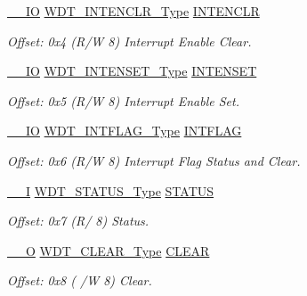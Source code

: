 \begin{DoxyCompactItemize}
\mbox{\hyperlink{core__cm0plus_8h_aec43007d9998a0a0e01faede4133d6be}{\+\_\+\+\_\+\+IO}} \mbox{\hyperlink{union_w_d_t___i_n_t_e_n_c_l_r___type}{W\+D\+T\+\_\+\+I\+N\+T\+E\+N\+C\+L\+R\+\_\+\+Type}} \mbox{\hyperlink{struct_wdt_a20a8733afbfa125c5b04dad935b603b5}{I\+N\+T\+E\+N\+C\+LR}}
\begin{DoxyCompactList}\small\item\em Offset\+: 0x4 (R/W 8) Interrupt Enable Clear. \end{DoxyCompactList}\item 
\mbox{\hyperlink{core__cm0plus_8h_aec43007d9998a0a0e01faede4133d6be}{\+\_\+\+\_\+\+IO}} \mbox{\hyperlink{union_w_d_t___i_n_t_e_n_s_e_t___type}{W\+D\+T\+\_\+\+I\+N\+T\+E\+N\+S\+E\+T\+\_\+\+Type}} \mbox{\hyperlink{struct_wdt_aabffd6be6854e3018e819d5848f109f2}{I\+N\+T\+E\+N\+S\+ET}}
\begin{DoxyCompactList}\small\item\em Offset\+: 0x5 (R/W 8) Interrupt Enable Set. \end{DoxyCompactList}\item 
\mbox{\hyperlink{core__cm0plus_8h_aec43007d9998a0a0e01faede4133d6be}{\+\_\+\+\_\+\+IO}} \mbox{\hyperlink{union_w_d_t___i_n_t_f_l_a_g___type}{W\+D\+T\+\_\+\+I\+N\+T\+F\+L\+A\+G\+\_\+\+Type}} \mbox{\hyperlink{struct_wdt_a535f9dc206f52a85eff66121e803c6db}{I\+N\+T\+F\+L\+AG}}
\begin{DoxyCompactList}\small\item\em Offset\+: 0x6 (R/W 8) Interrupt Flag Status and Clear. \end{DoxyCompactList}\item 
\mbox{\hyperlink{core__cm0plus_8h_af63697ed9952cc71e1225efe205f6cd3}{\+\_\+\+\_\+I}} \mbox{\hyperlink{union_w_d_t___s_t_a_t_u_s___type}{W\+D\+T\+\_\+\+S\+T\+A\+T\+U\+S\+\_\+\+Type}} \mbox{\hyperlink{struct_wdt_a88ccaf37a446b8485c1b235088d11594}{S\+T\+A\+T\+US}}
\begin{DoxyCompactList}\small\item\em Offset\+: 0x7 (R/ 8) Status. \end{DoxyCompactList}\item 
\mbox{\hyperlink{core__cm0plus_8h_a7e25d9380f9ef903923964322e71f2f6}{\+\_\+\+\_\+O}} \mbox{\hyperlink{union_w_d_t___c_l_e_a_r___type}{W\+D\+T\+\_\+\+C\+L\+E\+A\+R\+\_\+\+Type}} \mbox{\hyperlink{struct_wdt_a28c7a28f221d9f2da9d1ce57fff4ea49}{C\+L\+E\+AR}}
\begin{DoxyCompactList}\small\item\em Offset\+: 0x8 ( /W 8) Clear. \end{DoxyCompactList}\end{DoxyCompactItemize}


